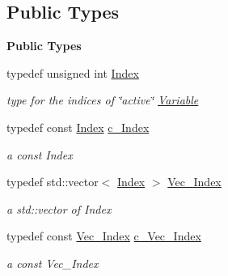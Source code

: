 \subsection*{Public Types}
\begin{Indent}\textbf{ Public Types}\par
\begin{DoxyCompactItemize}
\item 
typedef unsigned int \mbox{\hyperlink{group___thin_var_dep_interface___c_l_a_s_s_e_s_gad53d6229d7ec28555a9c9c2fd9abf773}{Index}}
\begin{DoxyCompactList}\small\item\em type for the indices of \char`\"{}active\char`\"{} \mbox{\hyperlink{class_s_m_spp__di__unipi__it_1_1_variable}{Variable}} \end{DoxyCompactList}\item 
typedef const \mbox{\hyperlink{group___thin_var_dep_interface___c_l_a_s_s_e_s_gad53d6229d7ec28555a9c9c2fd9abf773}{Index}} \mbox{\hyperlink{group___thin_var_dep_interface___c_l_a_s_s_e_s_gaee6156e2ce80720d57a082d80f39d8cc}{c\+\_\+\+Index}}
\begin{DoxyCompactList}\small\item\em a const Index \end{DoxyCompactList}\item 
typedef std\+::vector$<$ \mbox{\hyperlink{group___thin_var_dep_interface___c_l_a_s_s_e_s_gad53d6229d7ec28555a9c9c2fd9abf773}{Index}} $>$ \mbox{\hyperlink{group___thin_var_dep_interface___c_l_a_s_s_e_s_ga9a1284953e2aa5222b5867c0a7f98499}{Vec\+\_\+\+Index}}
\begin{DoxyCompactList}\small\item\em a std\+::vector of Index \end{DoxyCompactList}\item 
typedef const \mbox{\hyperlink{group___thin_var_dep_interface___c_l_a_s_s_e_s_ga9a1284953e2aa5222b5867c0a7f98499}{Vec\+\_\+\+Index}} \mbox{\hyperlink{group___thin_var_dep_interface___c_l_a_s_s_e_s_ga03461123d4f6090aefeb97ef653d3f2b}{c\+\_\+\+Vec\+\_\+\+Index}}
\begin{DoxyCompactList}\small\item\em a const Vec\+\_\+\+Index \end{DoxyCompactList}\end{DoxyCompactItemize}
\end{Indent}
